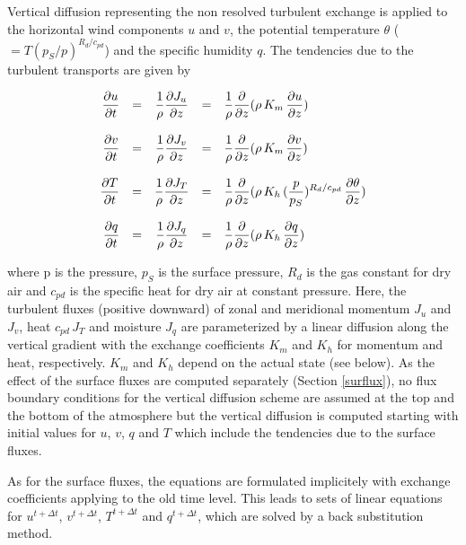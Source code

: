 Vertical diffusion representing the non resolved
turbulent exchange is applied to the horizontal wind
components $u$ and $v$, the potential temperature
$\theta$ ($= T (p_S/p)^{R_d/c_{pd}}$) and the
specific
humidity
$q$. The
tendencies due to the turbulent transports are given by 

\begin{equation}
\begin{array}{rcccl}
\displaystyle
\frac{\partial u}{\partial t} & = & \displaystyle \frac
{1}{\rho}\frac{\partial J_u}{\partial z} & = & \displaystyle \frac
{1}{\rho}\frac{\partial }{\partial z} ( \rho\, K_m \,
\frac{\partial u}{\partial z}) \\
&&&& \\
\displaystyle \frac{\partial v}{\partial t} & = & \displaystyle \frac
{1}{\rho}\frac{\partial J_v}{\partial z} & = & \displaystyle \frac
{1}{\rho}\frac{\partial }{\partial z} ( \rho \, K_m \,
\frac{\partial v}{\partial z} )\\
&&&& \\
\displaystyle \frac{\partial T}{\partial t} & = &\displaystyle  \frac
{1}{\rho}\frac{\partial J_T}{\partial z} & = & \displaystyle \frac
{1}{\rho}\frac{\partial }{\partial z} ( \rho \, K_h \, 
(\frac{p}{p_S})^{R_d/c_{pd}}\,\frac{\partial
\theta}{\partial
z})
\\
&&&& \\
\displaystyle \frac{\partial q}{\partial t} & = & \displaystyle \frac
{1}{\rho}\frac{\partial J_q}{\partial z} & = & \displaystyle \frac
{1}{\rho}\frac{\partial }{\partial z}( \rho\, K_h \,
\frac{\partial q}{\partial z} )
\end{array}
\end{equation}

where p is the
pressure, $p_S$ is the
surface pressure, $R_d$ is the gas constant
for dry air and $c_{pd}$ is
the specific heat for dry air at constant pressure. Here,
the turbulent
fluxes (positive downward) of zonal and meridional
momentum $J_u$ and 
$J_v$,
heat $c_{pd} \, J_T$
and moisture $J_q$ are parameterized by a linear
diffusion along the vertical gradient with the exchange
coefficients $K_m$ and $K_h$ for momentum and
heat,
respectively. $K_m$ and $K_h$ depend on the actual
state (see below).
As the effect of the surface fluxes are computed
separately (Section \ref{surflux}), no flux boundary
conditions for the vertical diffusion scheme  are
assumed
at the top and the bottom of the atmosphere but the
vertical diffusion is computed starting with
initial values for $u$, $v$, $q$ and $T$ which include
the tendencies due to the surface fluxes. 

As for the surface fluxes, the equations are formulated
implicitely with exchange coefficients applying to the
old time level. This  leads to sets of linear equations for
$u^{t+\Delta t}$, $v^{t+\Delta t}$, $T^{t+\Delta t}$
and $q^{t+\Delta t}$, which are solved by a back
substitution method.
 
